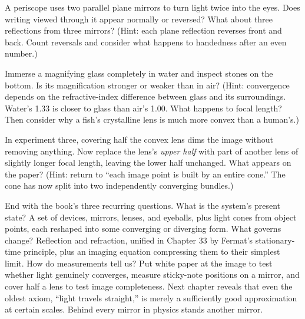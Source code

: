 \begin{mainline}
\begin{puzzles}
\item A periscope uses two parallel plane mirrors to turn light twice into the eyes. Does writing viewed through it appear normally or reversed? What about three reflections from three mirrors? (Hint: each plane reflection reverses front and back. Count reversals and consider what happens to handedness after an even number.)
\item Immerse a magnifying glass completely in water and inspect stones on the bottom. Is its magnification stronger or weaker than in air? (Hint: convergence depends on the refractive-index difference between glass and its surroundings. Water's 1.33 is closer to glass than air's 1.00. What happens to focal length? Then consider why a fish's crystalline lens is much more convex than a human's.)
\item In experiment three, covering half the convex lens dims the image without removing anything. Now replace the lens's \emph{upper half} with part of another lens of slightly longer focal length, leaving the lower half unchanged. What appears on the paper? (Hint: return to ``each image point is built by an entire cone.'' The cone has now split into two independently converging bundles.)
\end{puzzles}

End with the book's three recurring questions. What is the system's present state? A set of devices, mirrors, lenses, and eyeballs, plus light cones from object points, each reshaped into some converging or diverging form. What governs change? Reflection and refraction, unified in Chapter 33 by Fermat's stationary-time principle, plus an imaging equation compressing them to their simplest limit. How do measurements tell us? Put white paper at the image to test whether light genuinely converges, measure sticky-note positions on a mirror, and cover half a lens to test image completeness. Next chapter reveals that even the oldest axiom, ``light travels straight,'' is merely a sufficiently good approximation at certain scales. Behind every mirror in physics stands another mirror.

\end{mainline}

